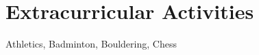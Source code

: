 \section{Extracurricular Activities}
    \begin{itemize}[leftmargin=0.15in, label={}]
	\small{\item{
        {Athletics, Badminton, Bouldering, Chess}
	}}
    \end{itemize}